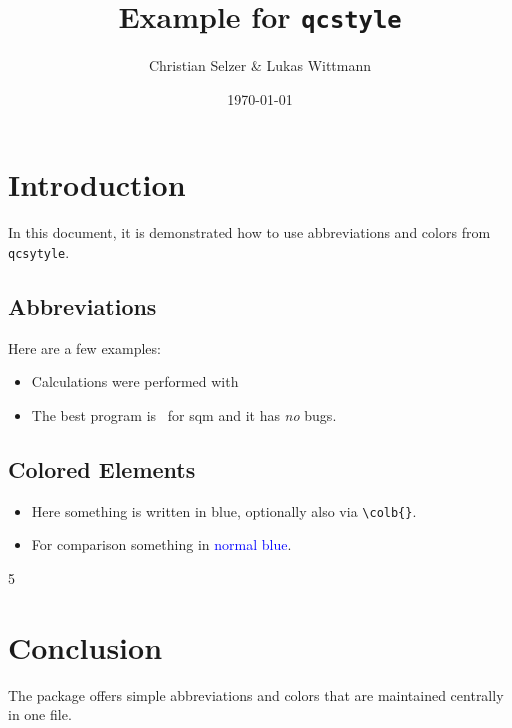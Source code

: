 \documentclass[a4paper,12pt]{article}
\title{Example for \texttt{qcstyle}}
\author{Christian Selzer \& Lukas Wittmann}
\date{\today}
\begin{document}
\maketitle

\section{Introduction}

    In this document, it is demonstrated how to use abbreviations and colors from \texttt{qcsytyle}.

\subsection{Abbreviations}
    Here are a few examples:
    \begin{itemize}
      \item Calculations were performed with \orca\
      \item The best program is \xtb\ for sqm and it has \emph{no} bugs.
    \end{itemize}

\subsection{Colored Elements}
    \begin{itemize}
        \item Here something is written in \textcolor{bonnblue}{blue}, optionally also via \verb|\colb{}|.
        \item For comparison something in \textcolor{blue}{normal blue}.
    \end{itemize}

    5\kcalmol

\section{Conclusion}
    The package offers simple abbreviations and colors that are maintained centrally in one file.
\end{document}
